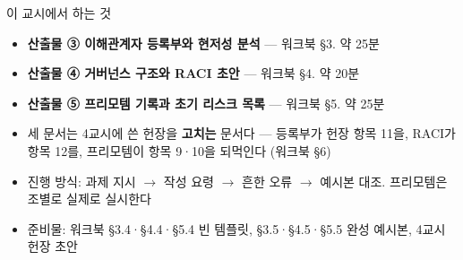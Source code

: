 \begin{frame}[allowframebreaks=1.0]{이 교시에서 하는 것}
\small
\begin{itemize}
\item\relax \textbf{산출물 ③ 이해관계자 등록부와 현저성 분석} — 워크북 §3. 약 25분
\item\relax \textbf{산출물 ④ 거버넌스 구조와 RACI 초안} — 워크북 §4. 약 20분
\item\relax \textbf{산출물 ⑤ 프리모템 기록과 초기 리스크 목록} — 워크북 §5. 약 25분
\item\relax 세 문서는 4교시에 쓴 헌장을 \textbf{고치는} 문서다 — 등록부가 헌장 항목 11을, RACI가 항목 12를, 프리모템이 항목 9·10을 되먹인다 (워크북 §6)
\item\relax 진행 방식: 과제 지시 $\rightarrow$ 작성 요령 $\rightarrow$ 흔한 오류 $\rightarrow$ 예시본 대조. 프리모템은 조별로 실제로 실시한다
\item\relax 준비물: 워크북 §3.4·§4.4·§5.4 빈 템플릿, §3.5·§4.5·§5.5 완성 예시본, 4교시 헌장 초안
\end{itemize}
\end{frame}

